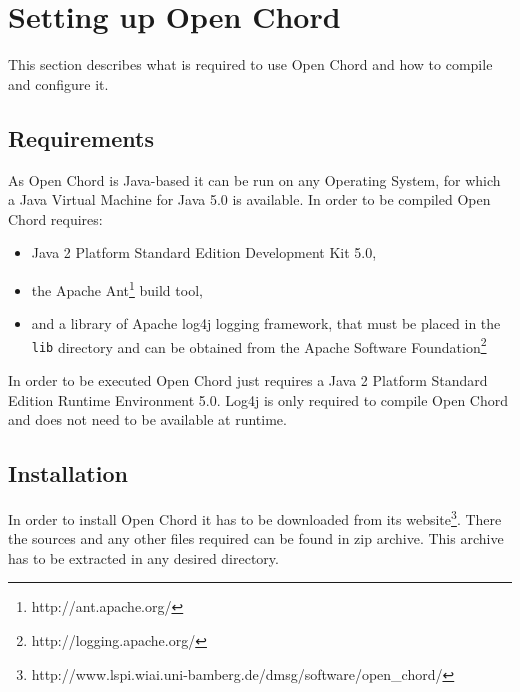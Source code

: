 \section{Setting up Open Chord} 
This section describes what is required to use Open Chord and how to compile and configure it. 

\subsection{Requirements}
As Open Chord is Java-based it can be run on any Operating System, for which a 
Java Virtual Machine for Java 5.0 is available. 
In order to be compiled Open Chord requires: 
\begin{itemize}
\vspace{-0.5cm}
\setlength\itemsep{-1ex}
\item Java 2 Platform Standard Edition Development Kit 5.0, 
\item the Apache Ant\footnote{http://ant.apache.org/} build tool, 
\item and a library of Apache log4j logging framework, that 
must be placed in the {\tt lib} directory and can be obtained from the 
Apache Software Foundation\footnote{http://logging.apache.org/}
\end{itemize}
\vspace{-0.5cm}
In order to be executed Open Chord just requires a Java 2 Platform Standard Edition 
Runtime Environment 5.0. Log4j is only required to compile Open Chord and does not need to 
be available at runtime. 

\subsection{Installation}\label{installation}
In order to install Open Chord it has to be downloaded from its website\footnote{http://www.lspi.wiai.uni-bamberg.de/dmsg/software/open\_chord/}. There 
the sources and any other files required can be found in zip archive. 
This archive has to be extracted in any desired directory. 

